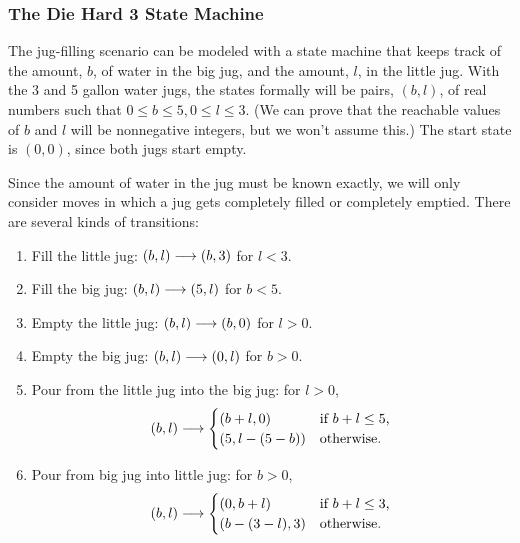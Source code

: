 \subsubsection{The Die Hard 3 State Machine}\label{diehard_machine}
The jug-filling scenario can be modeled with a state machine that keeps
track of the amount, $b$, of water in the big jug, and the amount, $l$,
in the little jug.  With the 3 and 5 gallon water jugs, the states
formally will be pairs, $(b,l)$, of real numbers such that $0 \leq b \leq
5, 0 \leq l \leq 3$.  (We can prove that the reachable values of $b$ and
$l$ will be nonnegative integers, but we won't assume this.)  The start
state is $(0,0)$, since both jugs start empty.

Since the amount of water in the jug must be known exactly, we will only
consider moves in which a jug gets completely filled or completely
emptied.  There are several kinds of transitions:
\begin{enumerate}

\item  Fill the little jug: $(b,l) \mathrel{\longrightarrow} (b,3)$ for $l < 3$.

\item  Fill the big jug: $(b,l) \mathrel{\longrightarrow} (5,l)$ for $b<5$.

\item  Empty the little jug: $(b,l) \mathrel{\longrightarrow} (b,0)$ for $l>0$.

\item  Empty the big jug: $(b,l) \mathrel{\longrightarrow} (0,l)$ for $b>0$.

\item  Pour from the little jug into the big jug: for $l>0$,
\begin{equation*}
(b,l) \mathrel{\longrightarrow}
\begin{cases}
(b+l, 0) & \text{if $b + l \le 5$,}\\
(5, l - (5 - b)) & \text{otherwise.}
\end{cases}
\end{equation*}

\item Pour from big jug into little jug: for $b>0$,
\begin{equation*}
(b,l) \mathrel{\longrightarrow}
\begin{cases}
(0, b+l) & \text{if $b + l \le 3$,}\\
(b - (3 -l), 3) & \text{otherwise.}
\end{cases}
\end{equation*}
\end{enumerate}

